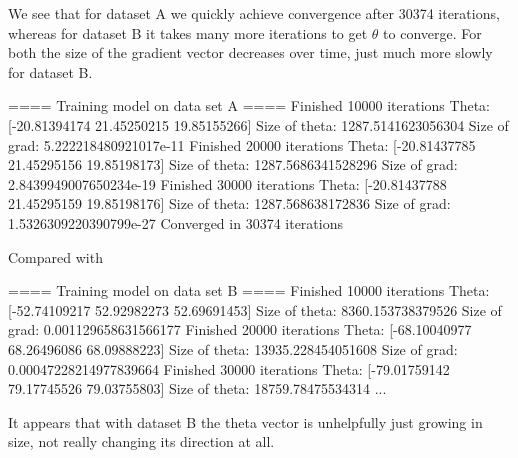 %
%
\begin{answer}
We see that for dataset A we quickly achieve convergence after 30374 iterations, whereas for dataset B it takes many more iterations to get $\theta$ to converge. For both the size of the gradient vector decreases over time, just much more slowly for dataset B.

\begin{verbatim*}
==== Training model on data set A ====
Finished 10000 iterations
Theta: [-20.81394174  21.45250215  19.85155266]
Size of theta: 1287.5141623056304
Size of grad: 5.222218480921017e-11
Finished 20000 iterations
Theta: [-20.81437785  21.45295156  19.85198173]
Size of theta: 1287.5686341528296
Size of grad: 2.8439949007650234e-19
Finished 30000 iterations
Theta: [-20.81437788  21.45295159  19.85198176]
Size of theta: 1287.568638172836
Size of grad: 1.5326309220390799e-27
Converged in 30374 iterations
\end{verbatim*}

Compared with

\begin{verbatim*}
==== Training model on data set B ====
Finished 10000 iterations
Theta: [-52.74109217  52.92982273  52.69691453]
Size of theta: 8360.153738379526
Size of grad: 0.001129658631566177
Finished 20000 iterations
Theta: [-68.10040977  68.26496086  68.09888223]
Size of theta: 13935.228454051608
Size of grad: 0.00047228214977839664
Finished 30000 iterations
Theta: [-79.01759142  79.17745526  79.03755803]
Size of theta: 18759.78475534314
...
\end{verbatim*}

It appears that with dataset B the theta vector is unhelpfully just growing in size, not really changing its direction at all.


\end{answer}
%